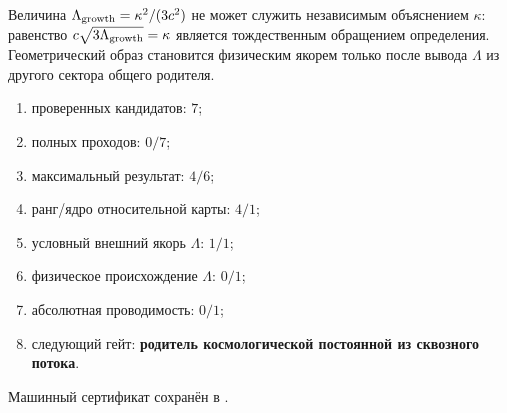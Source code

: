 \begin{nogocriterion}
Величина $\Lambda_{\rm growth}=\kappa^2/(3c^2)$ не может служить
независимым объяснением $\kappa$: равенство
$c\sqrt{3\Lambda_{\rm growth}}=\kappa$ является тождественным обращением
определения. Геометрический образ становится физическим якорем только после
вывода $\Lambda$ из другого сектора общего родителя.
\end{nogocriterion}

\begin{protocol}\begin{enumerate}
\item проверенных кандидатов: \textbf{$7$};
\item полных проходов: \textbf{$0/7$};
\item максимальный результат: \textbf{$4/6$};
\item ранг/ядро относительной карты: \textbf{$4/1$};
\item условный внешний якорь $\Lambda$: \textbf{$1/1$};
\item физическое происхождение $\Lambda$: \textbf{$0/1$};
\item абсолютная проводимость: \textbf{$0/1$};
\item следующий гейт: \textbf{родитель космологической постоянной из
сквозного потока}.
\end{enumerate}\end{protocol}

Машинный сертификат сохранён в
.